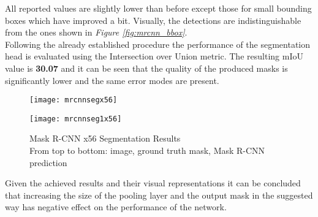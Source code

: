 \documentclass[main.tex]{subfiles}
\begin{document}
All reported values are slightly lower than before except those for small bounding boxes which have improved a bit. Visually, the detections are indistinguishable from the ones shown in \emph{Figure \ref{fig:mrcnn_bbox}}.\\
\indent Following the already established procedure the performance of the segmentation head is evaluated using the Intersection over Union metric. The resulting mIoU value is \textbf{30.07} and it can be seen that the quality of the produced masks is significantly lower and the same error modes are present.
\begin{figure}[H]
\centering
\texttt{[image: mrcnnsegx56]}
\end{figure}
\begin{figure}[h]
\centering
\texttt{[image: mrcnnseg1x56]}
\captionsetup{justification=centering}
\caption{Mask R-CNN x56 Segmentation Results \\ From top to bottom: image, ground truth mask, Mask R-CNN prediction}
\label{fig:mrcnnx56_masks}
\end{figure}
Given the achieved results and their visual representations it can be concluded that increasing the size of the pooling layer and the output mask in the suggested way has negative effect on the performance of the network. 
\end{document}
